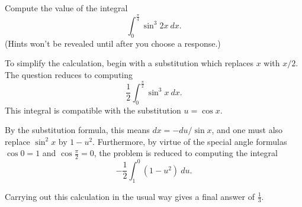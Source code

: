 \documentclass{ximera}
\begin{document}
\begin{question}%

Compute the value of the integral
\[\int_{0}^{\frac{\pi}{4}} \sin^{3} 2x ~dx.\]
(Hints won't be revealed until after you choose a response.)
\begin{multiplechoice}
\end{multiplechoice}
\begin{feedback}
To simplify the calculation, begin with a substitution which replaces \(x\) with \(x/2\). The question reduces to computing
\[\frac{1}{2}\int_{0}^{\frac{\pi}{2}} \sin^{3} x ~dx.\]
This integral is compatible with the substitution \(u = \cos x\). \begin{hint} By the substitution formula, this means \(dx = - du / \sin x\), and one must also replace \(\sin^2 x\) by \(1 - u^2\). Furthermore, by virtue of the special angle formulas \(\cos 0 = 1\) and \(\cos \frac{\pi}{2} = 0\), the problem is reduced to computing the integral
\[-\frac{1}{2}\int_{1}^{0} (1 - u^2) ~du.\]
\begin{hint}
Carrying out this calculation in the usual way gives a final answer of \(\frac{1}{3}\).
\end{hint}
\end{hint}
\end{feedback}

\end{question}
\end{document}
